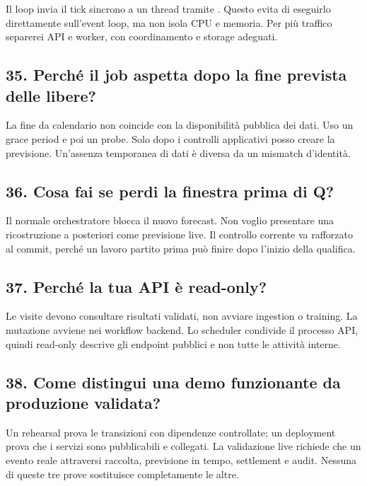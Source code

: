 \documentclass[11pt,a4paper]{article}
\newcommand{\code}[1]{{\ttfamily\small\seqsplit{#1}}}
\begin{document}
Il loop invia il tick sincrono a un thread tramite \code{asyncio.to\_thread}. Questo evita di eseguirlo direttamente sull'event loop, ma non isola CPU e memoria. Per più traffico separerei API e worker, con coordinamento e storage adeguati.

\subsection{35. Perché il job aspetta dopo la fine prevista delle libere?}\label{perchuxe9-il-job-aspetta-dopo-la-fine-prevista-delle-libere}

La fine da calendario non coincide con la disponibilità pubblica dei dati. Uso un grace period e poi un probe. Solo dopo i controlli applicativi posso creare la previsione. Un'assenza temporanea di dati è diversa da un mismatch d'identità.

\subsection{36. Cosa fai se perdi la finestra prima di Q?}\label{cosa-fai-se-perdi-la-finestra-prima-di-q}

Il normale orchestratore blocca il nuovo forecast. Non voglio presentare una ricostruzione a posteriori come previsione live. Il controllo corrente va rafforzato al commit, perché un lavoro partito prima può finire dopo l'inizio della qualifica.

\subsection{37. Perché la tua API è read-only?}\label{perchuxe9-la-tua-api-uxe8-read-only}

Le visite devono consultare risultati validati, non avviare ingestion o training. La mutazione avviene nei workflow backend. Lo scheduler condivide il processo API, quindi read-only descrive gli endpoint pubblici e non tutte le attività interne.

\subsection{38. Come distingui una demo funzionante da produzione validata?}\label{come-distingui-una-demo-funzionante-da-produzione-validata}

Un rehearsal prova le transizioni con dipendenze controllate; un deployment prova che i servizi sono pubblicabili e collegati. La validazione live richiede che un evento reale attraversi raccolta, previsione in tempo, settlement e audit. Nessuna di queste tre prove sostituisce completamente le altre.
\end{document}
